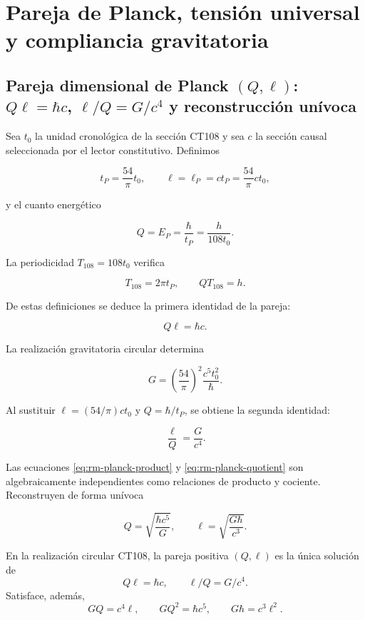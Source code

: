 \chapter{Pareja de Planck, tensi\'on universal y compliancia gravitatoria}
\label{chap:pareja-planck-respuesta}

\section{Pareja dimensional de Planck \((Q,\ell)\): \(Q\ell=\hbar c\), \(\ell/Q=G/c^4\) y reconstrucción unívoca}

Sea \(t_0\) la unidad cronol\'ogica de la secci\'on CT108 y sea \(c\) la
secci\'on causal seleccionada por el lector constitutivo. Definimos

\[
t_P=\frac{54}{\pi}t_0,
\qquad
\ell=\ell_P=ct_P=\frac{54}{\pi}ct_0,
\]

y el cuanto energ\'etico

\[
Q=E_P=\frac{\hbar}{t_P}=\frac{h}{108t_0}.
\]

La periodicidad \(T_{108}=108t_0\) verifica

\[
T_{108}=2\pi t_P,
\qquad
QT_{108}=h.
\]

De estas definiciones se deduce la primera identidad de la pareja:

\begin{equation}
\boxed{Q\ell=\hbar c.}
\label{eq:rm-planck-product}
\end{equation}

La realizaci\'on gravitatoria circular determina

\[
G=\left(\frac{54}{\pi}\right)^2\frac{c^5t_0^2}{\hbar}.
\]

Al sustituir \(\ell=(54/\pi)ct_0\) y \(Q=\hbar/t_P\), se obtiene la
segunda identidad:

\begin{equation}
\boxed{\frac{\ell}{Q}=\frac{G}{c^4}.}
\label{eq:rm-planck-quotient}
\end{equation}

Las ecuaciones \eqref{eq:rm-planck-product} y
\eqref{eq:rm-planck-quotient} son algebraicamente independientes como
relaciones de producto y cociente. Reconstruyen de forma un\'ivoca

\[
Q=\sqrt{\frac{\hbar c^5}{G}},
\qquad
\ell=\sqrt{\frac{G\hbar}{c^3}}.
\]

\begin{theorem}
\label{thm:rm-planck-pair}
En la realizaci\'on circular CT108, la pareja positiva \((Q,\ell)\) es la
\'unica soluci\'on de
\[
Q\ell=\hbar c,
\qquad
\ell/Q=G/c^4.
\]
Satisface, adem\'as,
\[
GQ=c^4\ell,
\qquad
GQ^2=\hbar c^5,
\qquad
G\hbar=c^3\ell^2.
\]
\end{theorem}

